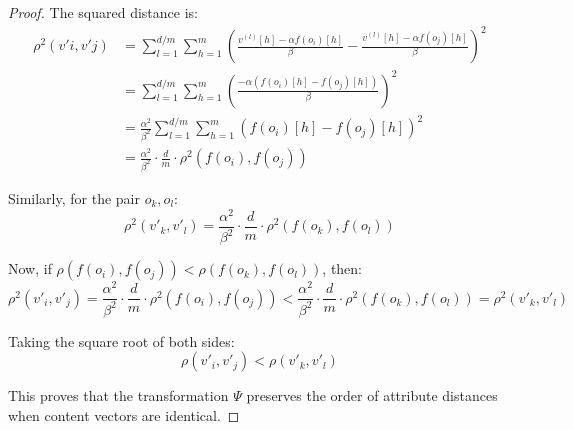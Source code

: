\documentclass[10pt,a4paper]{amsart}
\begin{document}
\begin{proof}
The squared distance is:
\begin{align}
\rho^2(v'i, v'j) &= \sum_{l=1}^{d/m} \sum_{h=1}^{m} \left(\frac{v^{(l)}[h] - \alpha f(o_i)[h]}{\beta} - \frac{v^{(l)}[h] - \alpha f(o_j)[h]}{\beta}\right)^2 \\
&= \sum_{l=1}^{d/m} \sum_{h=1}^{m} \left(\frac{-\alpha(f(o_i)[h] - f(o_j)[h])}{\beta}\right)^2 \\
&= \frac{\alpha^2}{\beta^2}\sum_{l=1}^{d/m} \sum_{h=1}^{m} (f(o_i)[h] - f(o_j)[h])^2 \\
&= \frac{\alpha^2}{\beta^2} \cdot \frac{d}{m} \cdot \rho^2(f(o_i), f(o_j))
\end{align}

Similarly, for the pair $o_k, o_l$:
\begin{equation}
\rho^2(v'_k, v'_l) = \frac{\alpha^2}{\beta^2} \cdot \frac{d}{m} \cdot \rho^2(f(o_k), f(o_l))
\end{equation}

Now, if $\rho(f(o_i), f(o_j)) < \rho(f(o_k), f(o_l))$, then:
\begin{equation}
\rho^2(v'_i, v'_j) = \frac{\alpha^2}{\beta^2} \cdot \frac{d}{m} \cdot \rho^2(f(o_i), f(o_j)) < \frac{\alpha^2}{\beta^2} \cdot \frac{d}{m} \cdot \rho^2(f(o_k), f(o_l)) = \rho^2(v'_k, v'_l)
\end{equation}

Taking the square root of both sides:
\begin{equation}
\rho(v'_i, v'_j) < \rho(v'_k, v'_l)
\end{equation}

This proves that the transformation $\Psi$ preserves the order of attribute distances when content vectors are identical.
\end{proof}
\end{document}

